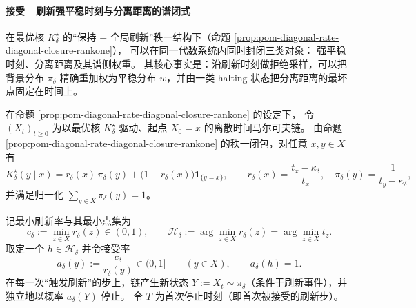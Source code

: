 
\paragraph{接受—刷新强平稳时刻与分离距离的谱闭式}\label{para:pom-diagonal-rate-refresh-strong-stationary-separation}
在最优核 \(K^\star_\delta\) 的“保持 \(+\) 全局刷新”秩一结构下（命题 \ref{prop:pom-diagonal-rate-diagonal-closure-rankone}），
可以在同一代数系统内同时封闭三类对象：
强平稳时刻、分离距离及其谱侧权重。
其核心事实是：沿刷新时刻做拒绝采样，可以把背景分布 \(\pi_\delta\) 精确重加权为平稳分布 \(w\)，并由一类 halting 状态把分离距离的最坏点固定在时间上。

\begin{definition}[接受—刷新强平稳时刻]\label{def:pom-diagonal-rate-accept-refresh-sst}
在命题 \ref{prop:pom-diagonal-rate-diagonal-closure-rankone} 的设定下，
令 \((X_t)_{t\ge 0}\) 为以最优核 \(K^\star_\delta\) 驱动、起点 \(X_0=x\) 的离散时间马尔可夫链。
由命题 \ref{prop:pom-diagonal-rate-diagonal-closure-rankone} 的秩一闭包，对任意 \(x,y\in X\) 有
\[
K^\star_\delta(y\mid x)
=r_\delta(x)\,\pi_\delta(y)+\bigl(1-r_\delta(x)\bigr)\mathbf 1_{\{y=x\}},
\qquad
r_\delta(x)=\frac{t_x-\kappa_\delta}{t_x},
\quad
\pi_\delta(y)=\frac{1}{t_y-\kappa_\delta},
\]
并满足归一化 \(\sum_{y\in X}\pi_\delta(y)=1\)。
\par
记最小刷新率与其最小点集为
\[
c_\delta:=\min_{z\in X} r_\delta(z)\in(0,1),
\qquad
\mathcal H_\delta:=\arg\min_{z\in X} r_\delta(z)=\arg\min_{z\in X} t_z.
\]
取定一个 \(h\in\mathcal H_\delta\) 并令接受率
\[
a_\delta(y):=\frac{c_\delta}{r_\delta(y)}\in(0,1]\qquad(y\in X),
\qquad a_\delta(h)=1.
\]
在每一次“触发刷新”的步上，链产生新状态 \(Y:=X_t\sim\pi_\delta\)（条件于刷新事件），并独立地以概率 \(a_\delta(Y)\) 停止。
令 \(T\) 为首次停止时刻（即首次被接受的刷新步）。
\end{definition}

